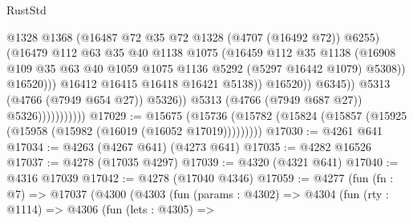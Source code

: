 \begin{lexlean}{RustStd}
\begin{coremodule}
{\begin{coremodule}
{{{{{{{{{{{{{{{{{{{{{{{{{{{{{{{{{{{                                              @1328
                                              @1368
                                              (@16487 @72 @35 @72 @1328 (@4707 (@16492 @72)) @6255)
                                              (@16479
                                                @112
                                                @63
                                                @35
                                                @40
                                                @1138
                                                @1075
                                                (@16459
                                                  @112
                                                  @35
                                                  @1138
                                                  (@16908
                                                    @109
                                                    @35
                                                    @63
                                                    @40
                                                    @1059
                                                    @1075
                                                    @1136
                                                    @5292
                                                    (@5297 @16442 @1079)
                                                    @5308))
                                                @16520)))
                                          @16412
                                          @16415
                                          @16418
                                          @16421
                                          @5138))
                                      @16520))
                                  @6345))
                              @5313
                              (@4766 (@7949 @654 @27))
                              @5326))
                          @5313
                          (@4766 (@7949 @687 @27))
                          @5326)))))))))))
@17029 := @15675
    (@15736 (@15782 (@15824 (@15857 (@15925 (@15958 (@15982 (@16019 (@16052 @17019)))))))))
@17030 := @4261 @641
@17034 := @4263 (@4267 @641) (@4273 @641)
@17035 := @4282 @16526
@17037 := @4278 (@17035 @4297)
@17039 := @4320 (@4321 @641)
@17040 := @4316 @17039
@17042 := @4278 (@17040 @4346)
@17059 := @4277
    (fun (fn : @7) =>
    @17037
      (@4300
        (@4303
          (fun (params : @4302) =>
          @4304
            (fun (rty : @1114) =>
            @4306
              (fun (lets : @4305) =>
}}}}}}}}}}}}}}}}}}}}}}}}}}}}}}}}}}}
\end{coremodule}}
\end{coremodule}
\end{lexlean}
